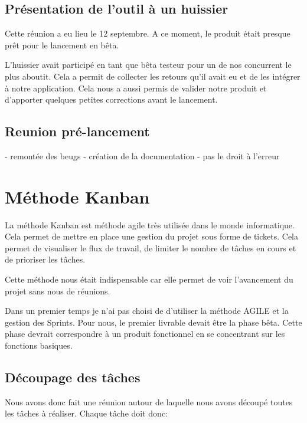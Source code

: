 \documentclass[]{report}
\begin{document}
    \subsection{Présentation de l’outil à un huissier}

      Cette réunion a eu lieu le 12 septembre. A ce moment, le produit était presque prêt pour le lancement en bêta.

      L'huissier avait participé en tant que bêta testeur pour un de nos concurrent le plus aboutit. Cela a permit de collecter les retours qu'il avait eu et de les intégrer à notre application. Cela nous a aussi permis de valider notre produit et d'apporter quelques petites corrections avant le lancement.

    \subsection{Reunion pré-lancement}

      - remontée des beugs
      - création de la documentation
      - pas le droit à l'erreur




  \section{Méthode Kanban}

    La méthode Kanban est méthode agile très utilisée dans le monde informatique. Cela permet de mettre en place une gestion du projet sous forme de tickets. Cela permet de visualiser le flux de travail, de limiter le nombre de tâches en cours et de prioriser les tâches.

    Cette méthode nous était indispensable car elle permet de voir l'avancement du projet sans nous  de réunions.

    Dans un premier temps je n'ai pas choisi de d'utiliser la méthode AGILE et la gestion des Sprints. Pour nous, le premier livrable devait être la phase bêta. Cette phase devrait correspondre à un produit fonctionnel en se concentrant sur les fonctions basiques.

    \subsection{Découpage des tâches}

      Nous avons donc fait une réunion autour de laquelle nous avons découpé toutes les tâches à réaliser. Chaque tâche doit donc:
\end{document}
